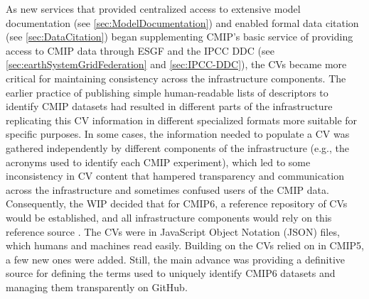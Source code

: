 \documentclass[manuscript]{copernicus}
\begin{document}
As new services that provided centralized access to extensive model documentation (see \autoref{sec:ModelDocumentation}) and enabled formal data citation (see \autoref{sec:DataCitation}) began supplementing CMIP's basic service of providing access to CMIP data through ESGF and the IPCC DDC (see \autoref{sec:earthSystemGridFederation} and \autoref{sec:IPCC-DDC}), the CVs became more critical for maintaining consistency across the infrastructure components. The earlier practice of publishing simple human-readable lists of descriptors to identify CMIP datasets had resulted in different parts of the infrastructure replicating this CV information in different specialized formats more suitable for specific purposes. In some cases, the information needed to populate a CV was gathered independently by different components of the infrastructure (e.g., the acronyms used to identify each CMIP experiment), which led to some inconsistency in CV content that hampered transparency and communication across the infrastructure and sometimes confused users of the CMIP data. Consequently, the WIP decided that for CMIP6, a reference repository of CVs would be established, and all infrastructure components would rely on this reference source \citep{durack_cmip6_2024}. The CVs were in JavaScript Object Notation (JSON) files, which humans and machines read easily. Building on the CVs relied on in CMIP5, a few new ones were added. Still, the main advance was providing a definitive source for defining the terms used to uniquely identify CMIP6 datasets and managing them transparently on GitHub.
\end{document}
